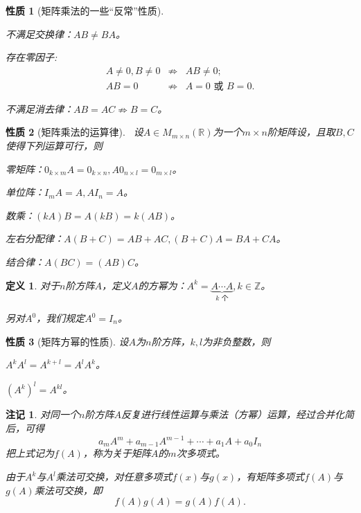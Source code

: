 \documentclass[a4paper]{book}
\newtheorem{prop}{性质}[chapter]
\newtheorem{Def}{定义}[chapter]
\newtheorem{rmk}{注记}[chapter]
\newcommand{\enum}{\begin{list}{}{\setlength{\leftmargin}{0pt} \setlength{\itemindent}{2.5em} \setlength{\listparindent}{2em}}}
\begin{document}
\begin{prop}[矩阵乘法的一些``反常''性质]\

\enum
\item[(1)] 不满足交换律：$AB\neq BA$。
\item[(2)] 存在零因子:
\begin{eqnarray*}
A \neq 0, B \neq 0 & \not\Rightarrow & AB \neq 0; \\
AB = 0 & \not\Rightarrow & A = 0 \text{ 或 } B = 0.
\end{eqnarray*}
\item[(3)] 不满足消去律：$AB = AC \not\Rightarrow B = C$。
\end{list}
\end{prop}

\begin{prop}[矩阵乘法的运算律]\
设$A\in M_{m\times n}(\mathbb{R})$为一个$m\times n$阶矩阵设，且取$B, C$使得下列运算可行，则
\enum
\item[(1)] 零矩阵：$0_{k\times m}A = 0_{k\times n}, A0_{n\times l} = 0_{m\times l}$。
\item[(2)] 单位阵：$I_mA = A, AI_n = A$。
\item[(3)] 数乘：$(kA)B = A(kB) = k(AB)$。
\item[(4)] 左右分配律：$A(B+C) = AB + AC, (B+C)A = BA+CA$。
\item[(5)] 结合律：$A(BC) = (AB)C$。
\end{list}
\end{prop}

\begin{Def}
对于$n$阶方阵$A$，定义$A$的方幂为：$A^k = \underbrace{A\cdots A}_{k \text{ 个}}, k\in \mathbb{Z}$。

另对$A^0$，我们规定$A^0 = I_n$。
\end{Def}

\begin{prop}[矩阵方幂的性质]
设$A$为$n$阶方阵，$k,l$为非负整数，则
\enum
\item[$\bullet$] $A^k A^l = A^{k+l} = A^l A^k$。
\item[$\bullet$] $(A^k)^l = A^{kl}$。
\end{list}
\end{prop}

\begin{rmk}
对同一个$n$阶方阵$A$反复进行线性运算与乘法（方幂）运算，经过合并化简后，可得
$$a_mA^m + a_{m-1}A^{m-1} + \cdots + a_1A + a_0I_n$$
把上式记为$f(A)$，称为关于矩阵$A$的$m$次多项式。

由于$A^k$与$A^l$乘法可交换，对任意多项式$f(x)$与$g(x)$，有矩阵多项式$f(A)$与$g(A)$乘法可交换，即
$$f(A)g(A) = g(A)f(A).$$
\end{rmk}
\end{document}
